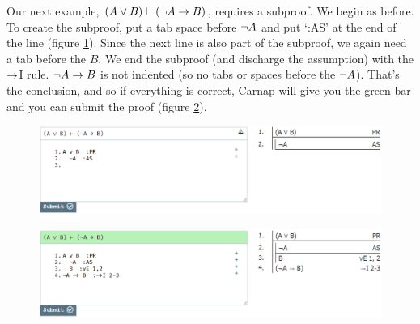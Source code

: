 Our next example, $(A \vee B) \vdash ({\neg} A \rightarrow B)$, requires a subproof. We begin as before. To create the subproof, put a tab space before ${\neg} A$ and put `:AS' at the end of the line (figure \ref{fig:proof-2a}). Since the next line is also part of the subproof, we again need a tab before the $B$. We end the subproof (and discharge the assumption) with the $\rightarrow$I rule. ${\neg} A \rightarrow B$ is not indented (so no tabs or spaces before the ${\neg} A$). That's the conclusion, and so if everything is correct, Carnap will give you the green bar and you can submit the proof (figure \ref{fig:proof-2b}). 

\begin{figure}[h]
\includegraphics[width=13cm]{textbook--2a.PNG}
\caption{}
\label{fig:proof-2a}
\end{figure}

\begin{figure}[h]
\includegraphics[width=13cm]{textbook--2b.PNG}
\caption{}
\label{fig:proof-2b}
\end{figure}

